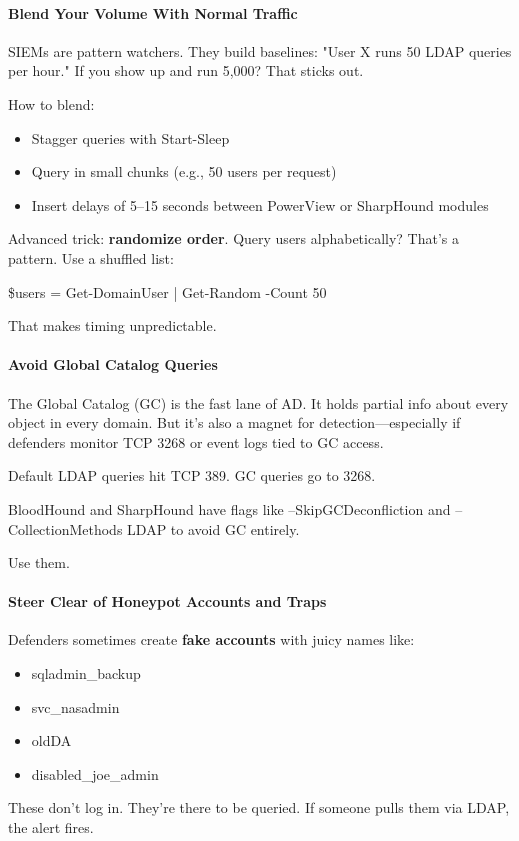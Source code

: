 \paragraph{\textbf{   Blend Your Volume With Normal Traffic}}

SIEMs are pattern watchers. They build baselines: "User X runs 50 LDAP queries per hour." If you show up and run 5,000? That sticks out.

How to blend:

\begin{itemize}
    \item Stagger queries with Start-Sleep

    \item Query in small chunks (e.g., 50 users per request)

    \item Insert delays of 5–15 seconds between PowerView or SharpHound modules

\end{itemize}
Advanced trick: \textbf{randomize order}. Query users alphabetically? That’s a pattern. Use a shuffled list:

\$users = Get-DomainUser | Get-Random -Count 50

That makes timing unpredictable.

\paragraph{\textbf{   Avoid Global Catalog Queries}}

The Global Catalog (GC) is the fast lane of AD. It holds partial info about every object in every domain. But it’s also a magnet for detection—especially if defenders monitor TCP 3268 or event logs tied to GC access.

Default LDAP queries hit TCP 389. GC queries go to 3268.

BloodHound and SharpHound have flags like --SkipGCDeconfliction and --CollectionMethods LDAP to avoid GC entirely.

Use them.

\paragraph{\textbf{   Steer Clear of Honeypot Accounts and Traps}}

Defenders sometimes create \textbf{fake accounts} with juicy names like:

\begin{itemize}
    \item sqladmin\_backup

    \item svc\_nasadmin

    \item oldDA

    \item disabled\_joe\_admin

\end{itemize}
These don’t log in. They’re there to be queried. If someone pulls them via LDAP, the alert fires.

